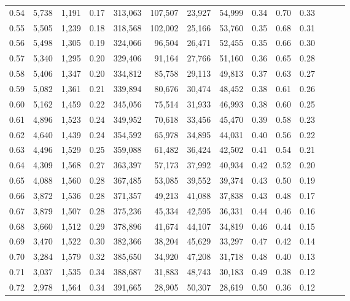 \begin{tabular}{rrrrrrrrrrrrrr}
0.54 &  5,738 &  1,191 &  0.17 &  313,063 &  107,507 &  23,927 &  54,999 &  0.34 &  0.70 &      0.33 \\
0.55 &  5,505 &  1,239 &  0.18 &  318,568 &  102,002 &  25,166 &  53,760 &  0.35 &  0.68 &      0.31 \\
0.56 &  5,498 &  1,305 &  0.19 &  324,066 &   96,504 &  26,471 &  52,455 &  0.35 &  0.66 &      0.30 \\
0.57 &  5,340 &  1,295 &  0.20 &  329,406 &   91,164 &  27,766 &  51,160 &  0.36 &  0.65 &      0.28 \\
0.58 &  5,406 &  1,347 &  0.20 &  334,812 &   85,758 &  29,113 &  49,813 &  0.37 &  0.63 &      0.27 \\
0.59 &  5,082 &  1,361 &  0.21 &  339,894 &   80,676 &  30,474 &  48,452 &  0.38 &  0.61 &      0.26 \\
0.60 &  5,162 &  1,459 &  0.22 &  345,056 &   75,514 &  31,933 &  46,993 &  0.38 &  0.60 &      0.25 \\
0.61 &  4,896 &  1,523 &  0.24 &  349,952 &   70,618 &  33,456 &  45,470 &  0.39 &  0.58 &      0.23 \\
0.62 &  4,640 &  1,439 &  0.24 &  354,592 &   65,978 &  34,895 &  44,031 &  0.40 &  0.56 &      0.22 \\
0.63 &  4,496 &  1,529 &  0.25 &  359,088 &   61,482 &  36,424 &  42,502 &  0.41 &  0.54 &      0.21 \\
0.64 &  4,309 &  1,568 &  0.27 &  363,397 &   57,173 &  37,992 &  40,934 &  0.42 &  0.52 &      0.20 \\
0.65 &  4,088 &  1,560 &  0.28 &  367,485 &   53,085 &  39,552 &  39,374 &  0.43 &  0.50 &      0.19 \\
0.66 &  3,872 &  1,536 &  0.28 &  371,357 &   49,213 &  41,088 &  37,838 &  0.43 &  0.48 &      0.17 \\
0.67 &  3,879 &  1,507 &  0.28 &  375,236 &   45,334 &  42,595 &  36,331 &  0.44 &  0.46 &      0.16 \\
0.68 &  3,660 &  1,512 &  0.29 &  378,896 &   41,674 &  44,107 &  34,819 &  0.46 &  0.44 &      0.15 \\
0.69 &  3,470 &  1,522 &  0.30 &  382,366 &   38,204 &  45,629 &  33,297 &  0.47 &  0.42 &      0.14 \\
0.70 &  3,284 &  1,579 &  0.32 &  385,650 &   34,920 &  47,208 &  31,718 &  0.48 &  0.40 &      0.13 \\
0.71 &  3,037 &  1,535 &  0.34 &  388,687 &   31,883 &  48,743 &  30,183 &  0.49 &  0.38 &      0.12 \\
0.72 &  2,978 &  1,564 &  0.34 &  391,665 &   28,905 &  50,307 &  28,619 &  0.50 &  0.36 &      0.12 \\

\end{tabular}

